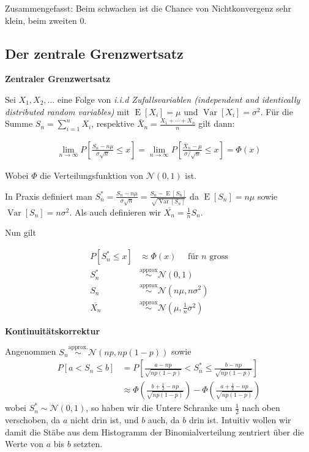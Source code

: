 \documentclass[25pt]{sciposter}
\newcommand{\Var}{\operatorname{Var}}
\newcommand{\E}{\operatorname{E}}
\newenvironment{method}[1]{\begin{mdframed}[backgroundcolor=blue!10,innertopmargin=15pt, innerbottommargin=15pt,nobreak=true]
		\textbf{#1 }
	}
	{ 
	\end{mdframed}
}
\newenvironment{thm}[1]{\begin{mdframed}[backgroundcolor=pink!20,innertopmargin=15pt, innerbottommargin=15pt, nobreak=true]
		\textbf{#1 }
	}
	{ 
	\end{mdframed}
}
\begin{document}
\begin{multicols}{3}
		Zusammengefasst: Beim schwachen ist die Chance von Nichtkonvergenz sehr klein, beim zweiten 0.
		
		\subsection*{Der zentrale Grenzwertsatz}
		
		
		\begin{method}{Zentraler Grenzwertsatz}
			Sei $X_1,X_2,\ldots$ eine Folge von \textit{i.i.d Zufallsvariablen (independent and identically distributed random variables)} mit $\E[X_i] = \mu$ und $\Var[X_i] = \sigma^2$. Für die Summe $S_n = \sum_{i=1}^{n} X_i$, respektive $\overline {X}_{n}={\frac  {X_{1}+\cdots +X_{n}}n}$ gilt dann:
			
			\begin{align*}
				\lim\limits_{n \to \infty} P\left[ \frac{S_n - n\mu}{\sigma \sqrt{n}} \leq x\right] = \lim _{{n\rightarrow \infty }}P\left[{\frac  {\overline {X}_{n}-\mu }{\sigma /{\sqrt  {n}}}}\leq x\right]= \Phi(x)
			\end{align*}
			
			Wobei $\Phi$ die Verteilungsfunktion von $\mathcal{N}(0,1)$ ist.	
		\end{method}
		
		In Praxis definiert man $S_n^* = \frac{S_n- n\mu}{\sigma \sqrt{n}} = \frac{S_n-\E[S_n]}{\sqrt{\Var[S_n]}}$ da $\E[S_n] = n\mu$ sowie $\Var[S_n] = n\sigma^2$. Als auch definieren wir $\overline{X_n} = \frac{1}{n}S_n$.
		
		Nun gilt
		
		\begin{align*}
			P[S_n^*\leq x] &\approx \Phi(x) \quad \text{ für $n$ gross}\\
			S_n^* &\stackrel{\text{approx}}{\sim} \mathcal{N}(0,1)\\
			S_n &\stackrel{\text{approx}}{\sim} \mathcal{N}(n\mu, n\sigma^2)\\
			\overline{X_n} &\stackrel{\text{approx}}{\sim} \mathcal{N}(\mu, \frac{1}{n}\sigma^2)
		\end{align*}
		
		
		\begin{thm}{Kontinuitätskorrektur}
			
			
			Angenommen $S_n \stackrel{\text{approx.}}{\sim} \mathcal{N}(np,np(1-p))$ sowie
			\begin{align*}
				P\left[ a < S_n  \leq b \right] &= P\left[ \frac{a-np}{ \sqrt{np(1-p)}} < S_n^* \leq \frac{b-np}{\sqrt{np(1-p)}} \right]\\
				&\approx \Phi \left(\frac{b+\frac{1}{2} - np}{\sqrt{np(1-p)}}\right) - \Phi \left(\frac{a+\frac{1}{2} - np}{\sqrt{np(1-p)}}\right)
			\end{align*}
			wobei $S^*_n \sim \mathcal{N}(0,1)$, so haben wir die Untere Schranke um $\frac{1}{2}$ nach oben verschoben, da $a$ nicht drin ist, und $b$ auch, da $b$ drin ist. Intuitiv wollen wir damit die Stäbe aus dem Histogramm der Binomialverteilung zentriert über die Werte von $a$ bis $b$ setzten.
		\end{thm}
		

\end{multicols}
\end{document}

